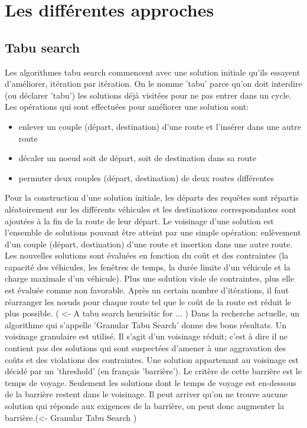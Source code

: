 \documentclass[10pt,a4paper]{report}
\begin{document}
\section*{Les différentes approches}

\subsection*{Tabu search}
Les algorithmes tabu search commencent avec une solution initiale qu'ils essayent d'améliorer, itération par itération. On le nomme 'tabu' parce qu'on doit interdire (ou déclarer 'tabu') les solutions déjà visitées pour ne pas entrer dans un cycle. Les opérations qui sont effectuées pour améliorer une solution sont:
\begin{itemize}
\item enlever un couple (départ, destination) d'une route et l'insérer dans une autre route
\item décaler un noeud soit de départ, soit de destination dans sa route
\item permuter deux couples (départ, destination) de deux routes différentes
\end{itemize}
Pour la construction d'une solution initiale, les départs des requêtes sont répartis aléatoirement sur les différents véhicules et les destinations correspondantes sont ajoutées à la fin de la route de leur départ. Le voisinage d'une solution est l'ensemble de solutions pouvant être atteint par une simple opération: enlèvement d'un couple (départ, destination) d'une route et insertion dans une autre route. Les nouvelles solutions sont évaluées en fonction du coût et des contraintes (la capacité des véhicules, les fenêtres de temps, la durée limite d'un véhicule et la charge maximale d'un véhicule). Plus une solution viole de contraintes, plus elle est évaluée comme non favorable. Après un certain nombre d'itérations, il faut réarranger les nœuds pour chaque route tel que le coût de la route est réduit le plus possible. ( <- A tabu search heurisitic for ... )
Dans la recherche actuelle, un algorithme qui s'appelle 'Granular Tabu Search' donne des bons résultats. Un voisinage granulaire est utilisé. Il s'agit d'un voisinage réduit; c'est à dire il ne contient pas des solutions qui sont suspectées d'amener à une aggravation des coûts et des violations des contraintes. Une solution appartenant au voisinage est décidé par un 'threshold' (en français 'barrière'). Le critère de cette barrière est le temps de voyage. Seulement les solutions dont le temps de voyage est en-dessous de la barrière restent dans le voisinage. Il peut arriver qu'on ne trouve aucune solution qui réponde aux exigences de la barrière, on peut donc augmenter la barrière.(<- Granular Tabu Search )
\end{document}
